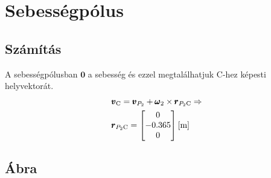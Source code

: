 \section{Sebességpólus}

\subsection{Számítás}
A sebességpólusban $\pmb{0}$ a sebesség és ezzel megtalálhatjuk $\text{C}$-hez képesti helyvektorát.
\begin{align}
	&\pmb{v}_\text{C} = \pmb{v}_{P_2} + \pmb{\omega}_2 \times \pmb{r}_{{P_2}\text{C}} \Rightarrow \\
	&\pmb{r}_{{P_2}\text{C}} =
	\begin{bmatrix}
		0 \\ -0.365 \\ 0
	\end{bmatrix} \siunit{}{\m}
\end{align}

\subsection{Ábra}
\structurespeedpole
